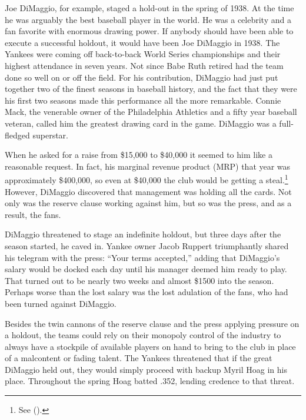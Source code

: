 \documentclass[12pt]{article}
\newcommand{\citee}[1]{\citename{#1} (\citeyear{#1})}
\begin{document}
Joe DiMaggio, for example, staged a hold-out in the spring of 1938.  At the time he was arguably the best baseball player in the world.  He was a celebrity and a fan favorite with enormous drawing power.  If anybody should have been able to execute a successful holdout, it would have been Joe DiMaggio in 1938.  The Yankees were coming off back-to-back World Series championships and their highest attendance in seven years.  Not since Babe Ruth retired had the team done so well on or off the field.  For his contribution, DiMaggio had just put together two of the finest seasons in baseball history, and the fact that they were his first two seasons made this performance all the more remarkable.  Connie Mack, the venerable owner of the Philadelphia Athletics and a fifty year baseball veteran, called him the greatest drawing card in the game.  DiMaggio was a full-fledged superstar.

When he asked for a raise from \$15,000 to \$40,000 it seemed to him like a reasonable request.  In fact, his marginal revenue product (MRP) that year was approximately \$400,000, so even at \$40,000 the club would be getting a steal.\footnote{See \citee{haupert2009}.}  However, DiMaggio discovered that management was holding all the cards.  Not only was the reserve clause working against him, but so was the press, and as a result, the fans.

DiMaggio threatened to stage an indefinite holdout, but three days after the season started, he caved in.  Yankee owner Jacob Ruppert triumphantly shared his telegram with the press: ``Your terms accepted,'' adding that DiMaggio's salary would be docked each day until his manager deemed him ready to play.  That turned out to be nearly two weeks and almost \$1500 into the season.  Perhaps worse than the lost salary was the lost adulation of the fans, who had been turned against DiMaggio. 

Besides the twin cannons of the reserve clause and the press applying pressure on a holdout, the teams could rely on their monopoly control of the industry to always have a stockpile of available players on hand to bring to the club in place of a malcontent or fading talent.  The Yankees threatened that if the great DiMaggio held out, they would simply proceed with backup Myril Hoag in his place.  Throughout the spring Hoag batted .352, lending credence to that threat.
\end{document}
